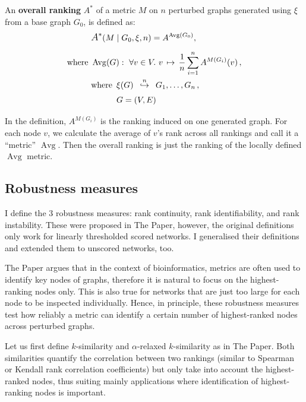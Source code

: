 \begin{definition}
    \label{def:overall_ranking}
    An \textbf{overall ranking} $A^*$ of a metric $M$ on $n$ perturbed graphs generated using $\xi$ from a base graph $G_0$, is defined as:
    \begin{align*}
        &\mathlarger{A^*}\!\left( M \mid G_0, \xi, n \right) = A^{\operatorname{Avg}(G_0)} ,\\[5pt]
        \text{where}~&\operatorname{Avg}(G) :\ \forall v \in V.\ v \,\mapsto\, \frac{1}{n} \sum_{i=1}^n A^{M(G_i)}(v)\, , \\
        &\begin{aligned}
             \text{where}~\,&\xi(G) \generates{n} G_1, \dots, G_n\,, \\
             & G = (V, E)
        \end{aligned}
    \end{align*}
\end{definition}

In the definition, $A^{M(G_i)}$ is the ranking induced on one generated graph.
For each node $v$, we calculate the average of $v$'s rank across all rankings and call it a ``metric'' $\operatorname{Avg}$.
Then the overall ranking is just the ranking of the locally defined $\operatorname{Avg}$ metric.

\subsection{Robustness measures}\label{sec:robustness_measures}

I define the 3 robustness measures: rank continuity, rank identifiability, and rank instability.
These were proposed in The Paper, however, the original definitions only work for linearly thresholded scored networks.
I generalised their definitions and extended them to unscored networks, too.

The Paper argues that in the context of bioinformatics, metrics are often used to identify key nodes of graphs, therefore it is natural to focus on the highest-ranking nodes only.
This is also true for networks that are just too large for each node to be inspected individually.
Hence, in principle, these robustness measures test how reliably a metric can identify a certain number of highest-ranked nodes across perturbed graphs.

Let us first define $k$-similarity and $\alpha$-relaxed $k$-similarity as in The Paper.
Both similarities quantify the correlation between two rankings (similar to Spearman or Kendall rank correlation coefficients) but only take into account the highest-ranked nodes, thus suiting mainly applications where identification of highest-ranking nodes is important.

